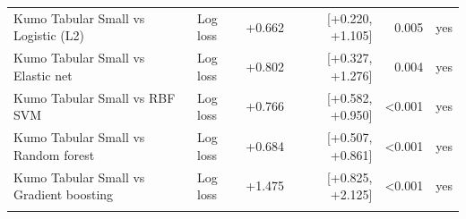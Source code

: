 \begin{tabular}{llrrrr}
Kumo Tabular Small vs Logistic (L2) & Log loss & +0.662 & [+0.220, +1.105] & 0.005 & yes \\
Kumo Tabular Small vs Elastic net & Log loss & +0.802 & [+0.327, +1.276] & 0.004 & yes \\
Kumo Tabular Small vs RBF SVM & Log loss & +0.766 & [+0.582, +0.950] & <0.001 & yes \\
Kumo Tabular Small vs Random forest & Log loss & +0.684 & [+0.507, +0.861] & <0.001 & yes \\
Kumo Tabular Small vs Gradient boosting & Log loss & +1.475 & [+0.825, +2.125] & <0.001 & yes \\
\addlinespace
\bottomrule
\end{tabular}

